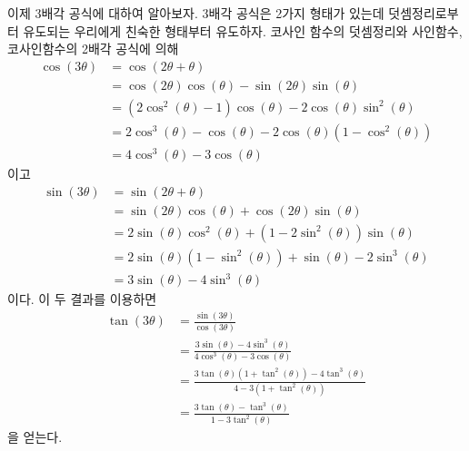 \documentclass[11pt, a4paper]{book}
\begin{document}
 이제 3배각 공식에 대하여 알아보자. 3배각 공식은 2가지 형태가 있는데 덧셈정리로부터 유도되는 우리에게 친숙한 형태부터 유도하자. 코사인 함수의 덧셈정리와 사인함수, 코사인함수의 2배각 공식에 의해
 \begin{align*}
 	\cos(3\theta) & = \cos(2\theta +\theta)\\
 	&= \cos(2\theta)\cos(\theta) - \sin(2\theta)\sin(\theta)\\
 	&= \left(2\cos^{2}(\theta)-1\right) \cos(\theta) - 2\cos(\theta)\sin^{2}(\theta)\\
 	&= 2\cos^{3}(\theta)- \cos(\theta) - 2 \cos(\theta)\left(1- \cos^{2}(\theta)\right)\\
 	&= 4 \cos^{3}(\theta) - 3\cos(\theta)
 \end{align*}
이고
 \begin{align*}
	\sin(3\theta) & = \sin(2\theta +\theta)\\
	&= \sin(2\theta)\cos(\theta) + \cos(2\theta)\sin(\theta)\\
	&= 2\sin(\theta) \cos^{2}(\theta) +  \left(1-2\sin^{2}(\theta)\right)\sin(\theta)\\
	&= 2\sin(\theta)(1- \sin^{2}(\theta)) +  \sin(\theta)- 2\sin^{3}(\theta)\\
	&= 3 \sin(\theta) - 4\sin^{3}(\theta)
\end{align*}
이다. 이 두 결과를 이용하면
\begin{align*}
\tan(3\theta) &= \frac{\sin(3\theta)}{\cos(3\theta)}\\
			  &= \frac{3\sin(\theta)-4\sin^{3}(\theta)}{4 \cos^{3}(\theta)-3 \cos(\theta)}\\
			  &= \frac{3\tan(\theta)(1+\tan^{2}(\theta))- 4 \tan^{3}(\theta)}{4 - 3(1+\tan^{2}(\theta))}\\
			  &= \frac{3\tan(\theta)-\tan^{3}(\theta)}{1-3 \tan^{2}(\theta)}
\end{align*}
을 얻는다.
 
\end{document}
